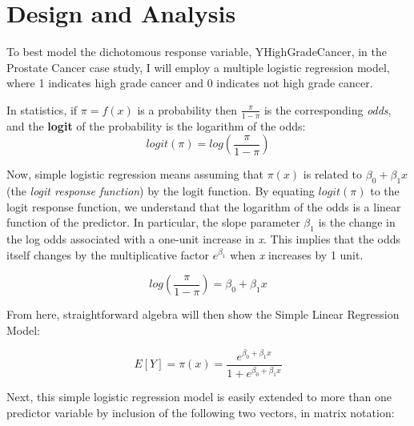 %
%


\section{Design and Analysis}
To best model the dichotomous response variable, Y\textunderscore HighGradeCancer, in the Prostate Cancer case study, I will employ a multiple logistic regression model, where 1 indicates high grade cancer and 0 indicates not high grade cancer. \par
In statistics, if \(\pi = f(x)\) is a probability then \(\frac{\pi}{1-\pi}\) is the corresponding \textit{odds}, and the \textbf{logit} of the probability is the logarithm of the odds:
\begin{equation}
	logit(\pi) = log(\frac{\pi}{1-\pi})
\end{equation}

Now, simple logistic regression means assuming that \(\pi(x)\) is related to \(\beta_0 + \beta_1x\) (the \textit{logit response function}) by the logit function. By equating \(logit(\pi)\) to the logit response function, we understand that the logarithm of the odds is a linear function of the predictor. In particular, the slope parameter \(\beta_1\) is the change in the log odds associated with a one-unit increase in \textit{x}. This implies that the odds itself changes by the multiplicative factor \(e^{\beta_1}\) when \textit{x} increases by 1 unit.

\begin{equation}
	log(\frac{\pi}{1-\pi}) = \beta_0 + \beta_1x
\end{equation}

From here, straightforward algebra will then show the Simple Linear Regression Model:

\begin{equation}
	E[Y] = \pi(x) = \frac{e^{\beta_0 + \beta_1x}}{1+e^{\beta_0 + \beta_1x}}
\end{equation}

Next, this simple logistic regression model is easily extended to more than one predictor variable by inclusion of the following two vectors, in matrix notation:


